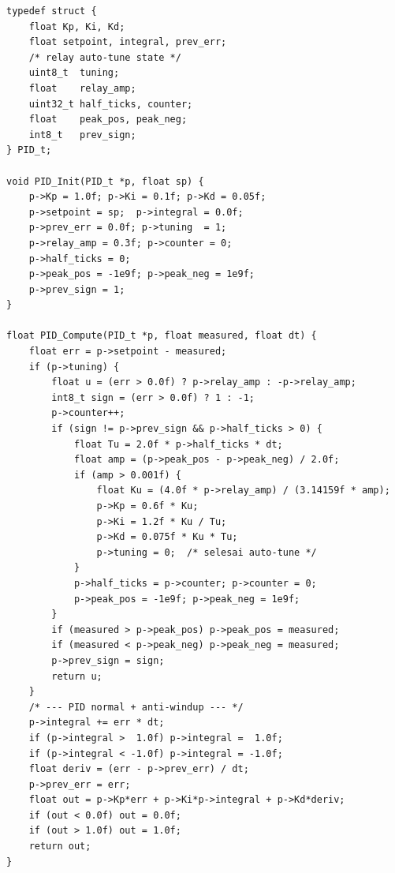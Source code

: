\documentclass[12pt,a4paper]{article}
\begin{document}
\begin{lstlisting}[style=cstyle,
  caption={PID relay feedback auto-tune Ziegler-Nichols untuk kontrol motor (FW15).}]
typedef struct {
    float Kp, Ki, Kd;
    float setpoint, integral, prev_err;
    /* relay auto-tune state */
    uint8_t  tuning;
    float    relay_amp;
    uint32_t half_ticks, counter;
    float    peak_pos, peak_neg;
    int8_t   prev_sign;
} PID_t;

void PID_Init(PID_t *p, float sp) {
    p->Kp = 1.0f; p->Ki = 0.1f; p->Kd = 0.05f;
    p->setpoint = sp;  p->integral = 0.0f;
    p->prev_err = 0.0f; p->tuning  = 1;
    p->relay_amp = 0.3f; p->counter = 0;
    p->half_ticks = 0;
    p->peak_pos = -1e9f; p->peak_neg = 1e9f;
    p->prev_sign = 1;
}

float PID_Compute(PID_t *p, float measured, float dt) {
    float err = p->setpoint - measured;
    if (p->tuning) {
        float u = (err > 0.0f) ? p->relay_amp : -p->relay_amp;
        int8_t sign = (err > 0.0f) ? 1 : -1;
        p->counter++;
        if (sign != p->prev_sign && p->half_ticks > 0) {
            float Tu = 2.0f * p->half_ticks * dt;
            float amp = (p->peak_pos - p->peak_neg) / 2.0f;
            if (amp > 0.001f) {
                float Ku = (4.0f * p->relay_amp) / (3.14159f * amp);
                p->Kp = 0.6f * Ku;
                p->Ki = 1.2f * Ku / Tu;
                p->Kd = 0.075f * Ku * Tu;
                p->tuning = 0;  /* selesai auto-tune */
            }
            p->half_ticks = p->counter; p->counter = 0;
            p->peak_pos = -1e9f; p->peak_neg = 1e9f;
        }
        if (measured > p->peak_pos) p->peak_pos = measured;
        if (measured < p->peak_neg) p->peak_neg = measured;
        p->prev_sign = sign;
        return u;
    }
    /* --- PID normal + anti-windup --- */
    p->integral += err * dt;
    if (p->integral >  1.0f) p->integral =  1.0f;
    if (p->integral < -1.0f) p->integral = -1.0f;
    float deriv = (err - p->prev_err) / dt;
    p->prev_err = err;
    float out = p->Kp*err + p->Ki*p->integral + p->Kd*deriv;
    if (out < 0.0f) out = 0.0f;
    if (out > 1.0f) out = 1.0f;
    return out;
}
\end{lstlisting}
\end{document}
